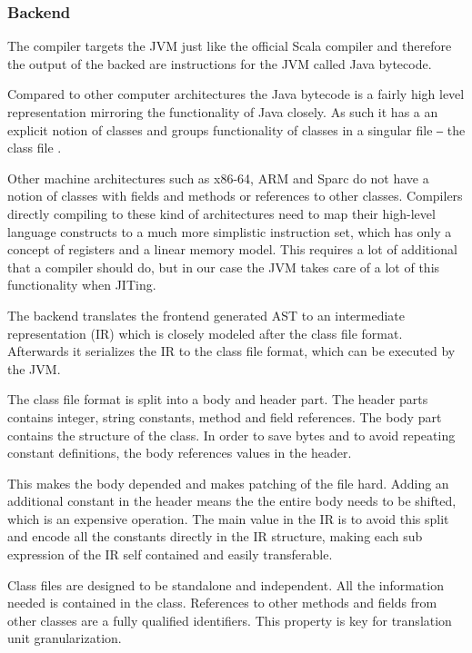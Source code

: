 \documentclass{VUMIFPSbakalaurinis}
\begin{document}
%

\subsubsection{Backend}

The compiler targets the JVM just like the official Scala compiler and therefore the output of the backed are instructions for the JVM called Java bytecode.

Compared to other computer architectures the Java bytecode is a fairly high level representation mirroring the functionality of Java closely.
As such it has a an explicit notion of classes and groups functionality of classes in a singular file ‒ the class file \cite{ClassFileFormat}.

Other machine architectures such as x86-64, ARM and Sparc do not have a notion of classes with fields and methods or references to other classes.
Compilers directly compiling to these kind of architectures need to map their high-level language constructs to a much more simplistic instruction set, which has only a concept of registers and a linear memory model.
This requires a lot of additional that a compiler should do, but in our case the JVM takes care of a lot of this functionality when JITing.

The backend translates the frontend generated AST to an intermediate representation (IR) which is closely modeled after the class file format.
Afterwards it serializes the IR to the class file format, which can be executed by the JVM.

The class file format is split into a body and header part.
The header parts contains integer, string constants, method and field references.
The body part contains the structure of the class.
In order to save bytes and to avoid repeating constant definitions, the body references values in the header.

This makes the body depended and makes patching of the file hard.
Adding an additional constant in the header means the the entire body needs to be shifted, which is an expensive operation.
The main value in the IR is to avoid this split and encode all the constants directly in the IR structure, making each sub expression of the IR self contained and easily transferable.

Class files are designed to be standalone and independent.
All the information needed is contained in the class.
References to other methods and fields from other classes are a fully qualified identifiers.
This property is key for translation unit granularization.
\end{document}
